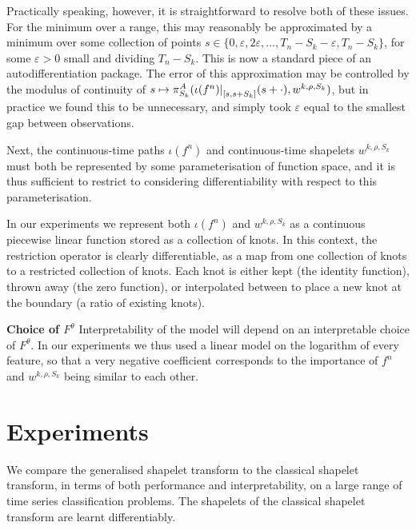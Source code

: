 \documentclass{article}
\theoremstyle{plain}
\theoremstyle{definition}
\newcommand{\reals}{\mathbb{R}}
\newcommand{\restr}[2]{{\left.\kern-\nulldelimiterspace #1 \right|_{#2}}}
\newcommand{\boldheading}[1]{

\textbf{#1}\quad}
\begin{document}
	Practically speaking, however, it is straightforward to resolve both of these issues. For the minimum over a range, this may reasonably be approximated by a minimum over some collection of points $s \in \{0, \varepsilon, 2 \varepsilon, \ldots, T_n - S_k - \varepsilon, T_n - S_k\}$, for some $\varepsilon > 0$ small and dividing $T_n - S_k$. This is now a standard piece of an autodifferentiation package. The error of this approximation may be controlled by the modulus of continuity of $s \mapsto \pi^A_{S_k}(\restr{\iota(f^n)}{[s, s + S_k]}(s + \cdot), w^{k, \rho, S_k})$, but in practice we found this to be unnecessary, and simply took $\varepsilon$ equal to the smallest gap between observations.
	
	Next, the continuous-time paths $\iota(f^n)$ and continuous-time shapelets $w^{k, \rho, S_k}$ must both be represented by some parameterisation of function space, and it is thus sufficient to restrict to considering differentiability with respect to this parameterisation.
	
	In our experiments we represent both $\iota(f^n)$ and $w^{k, \rho, S_k}$ as a continuous piecewise linear function stored as a collection of knots. In this context, the restriction operator is clearly differentiable, as a map from one collection of knots to a restricted collection of knots. Each knot is either kept (the identity function), thrown away (the zero function), or interpolated between to place a new knot at the boundary (a ratio of existing knots).

	
	\boldheading{Choice of $F^\theta$}\label{section:choice-of-f}
	Interpretability of the model will depend on an interpretable choice of $F^\theta$. In our experiments we thus used a linear model on the logarithm of every feature, so that a very negative coefficient corresponds to the importance of $f^n$ and $w^{k, \rho, S_k}$ being similar to each other.
	
	
\section{Experiments}\label{section:experiments}
We compare the generalised shapelet transform to the classical shapelet transform, in terms of both performance and interpretability, on a large range of time series classification problems. The shapelets of the classical shapelet transform are learnt differentiably.
\end{document}
